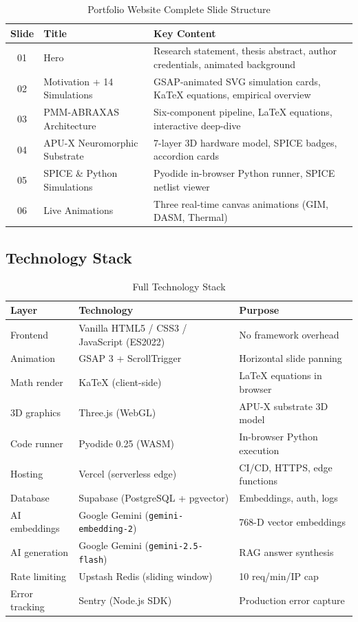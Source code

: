 \documentclass[12pt, a4paper]{article}
\begin{document}
\begin{table}[H]
  \centering
  \caption{Portfolio Website Complete Slide Structure}
  \begin{tabularx}{\textwidth}{cXX}
    \toprule
    \textbf{Slide} & \textbf{Title} & \textbf{Key Content} \\
    \midrule
    01 & Hero & Research statement, thesis abstract, author credentials, animated background \\
    02 & Motivation + 14 Simulations & GSAP-animated SVG simulation cards, KaTeX equations, empirical overview \\
    03 & PMM-ABRAXAS Architecture & Six-component pipeline, LaTeX equations, interactive deep-dive \\
    04 & APU-X Neuromorphic Substrate & 7-layer 3D hardware model, SPICE badges, accordion cards \\
    05 & SPICE \& Python Simulations & Pyodide in-browser Python runner, SPICE netlist viewer \\
    06 & Live Animations & Three real-time canvas animations (GIM, DASM, Thermal) \\
    \bottomrule
  \end{tabularx}
\end{table}

\subsection{Technology Stack}

\begin{table}[H]
  \centering
  \caption{Full Technology Stack}
  \small
  \begin{tabularx}{\textwidth}{lXl}
    \toprule
    \textbf{Layer} & \textbf{Technology} & \textbf{Purpose} \\
    \midrule
    Frontend & Vanilla HTML5 / CSS3 / JavaScript (ES2022) & No framework overhead \\
    Animation & GSAP 3 + ScrollTrigger & Horizontal slide panning \\
    Math render & KaTeX (client-side) & LaTeX equations in browser \\
    3D graphics & Three.js (WebGL) & APU-X substrate 3D model \\
    Code runner & Pyodide 0.25 (WASM) & In-browser Python execution \\
    Hosting & Vercel (serverless edge) & CI/CD, HTTPS, edge functions \\
    Database & Supabase (PostgreSQL + pgvector) & Embeddings, auth, logs \\
    AI embeddings & Google Gemini (\texttt{gemini-embedding-2}) & 768-D vector embeddings \\
    AI generation & Google Gemini (\texttt{gemini-2.5-flash}) & RAG answer synthesis \\
    Rate limiting & Upstash Redis (sliding window) & 10 req/min/IP cap \\
    Error tracking & Sentry (Node.js SDK) & Production error capture \\
    \bottomrule
  \end{tabularx}
\end{table}
\end{document}
